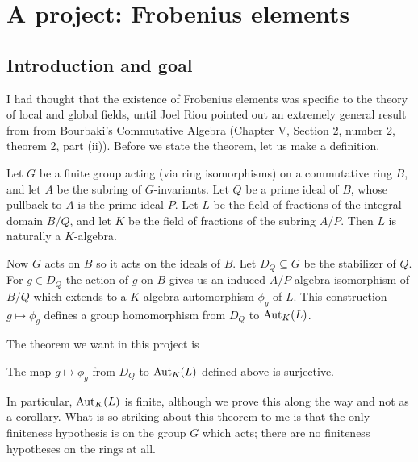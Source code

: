 \chapter{A project: Frobenius elements}

\section{Introduction and goal}

I had thought that the existence of Frobenius elements was specific to the theory
of local and global fields, until Joel Riou pointed out
an extremely general result from from Bourbaki's Commutative Algebra
(Chapter V, Section 2, number 2, theorem 2, part (ii)). Before we state the
theorem, let us make a definition.

\begin{definition}
  \label{Pointwise.stabilizer.toGaloisGroup}
  Let $G$ be a finite group acting (via ring isomorphisms) on a commutative ring $B$,
  and let $A$ be the subring of $G$-invariants. Let $Q$ be a prime ideal of $B$, whose
  pullback to $A$ is the prime ideal $P$. Let $L$ be the field of fractions
  of the integral domain $B/Q$, and let $K$ be the field of fractions
  of the subring $A/P$. Then $L$ is naturally a $K$-algebra.

  Now $G$ acts on $B$ so it acts on the ideals of $B$. Let $D_Q\subseteq G$ be the
  stabilizer of $Q$. For $g\in D_Q$ the action of $g$ on $B$ gives us an induced
  $A/P$-algebra isomorphism of $B/Q$ which extends to a $K$-algebra automorphism $\phi_g$ of $L$.
  This construction $g\mapsto \phi_g$ defines a group homomorphism from $D_Q$
  to $\operatorname{Aut}_K(L)$.
  \leanok
\end{definition}

The theorem we want in this project is
\begin{theorem}
  \label{MulAction.stabilizer_surjective_of_action}
  The map $g\mapsto \phi_g$ from $D_Q$ to $\operatorname{Aut}_K(L)$ defined above is surjective.
\end{theorem}

In particular, $\operatorname{Aut}_K(L)$ is finite, although we prove this along the way and not
as a corollary. What is so striking about this theorem to me is that the only finiteness hypothesis
is on the group $G$ which acts; there are no finiteness hypotheses on the rings at all.

